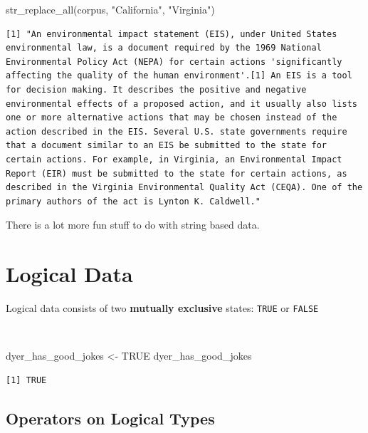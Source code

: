 \documentclass[
  letterpaper,
]{book}
\newenvironment{Shaded}{\begin{snugshade}}{\end{snugshade}}
\newcommand{\ConstantTok}[1]{\textcolor[rgb]{0.56,0.35,0.01}{#1}}
\newcommand{\FunctionTok}[1]{\textcolor[rgb]{0.28,0.35,0.67}{#1}}
\newcommand{\NormalTok}[1]{\textcolor[rgb]{0.00,0.23,0.31}{#1}}
\newcommand{\OtherTok}[1]{\textcolor[rgb]{0.00,0.23,0.31}{#1}}
\newcommand{\StringTok}[1]{\textcolor[rgb]{0.13,0.47,0.30}{#1}}
\begin{document}
\begin{Shaded}
\begin{Highlighting}[]
\FunctionTok{str\_replace\_all}\NormalTok{(corpus, }\StringTok{"California"}\NormalTok{, }\StringTok{"Virginia"}\NormalTok{)}
\end{Highlighting}
\end{Shaded}

\begin{verbatim}
[1] "An environmental impact statement (EIS), under United States environmental law, is a document required by the 1969 National Environmental Policy Act (NEPA) for certain actions 'significantly affecting the quality of the human environment'.[1] An EIS is a tool for decision making. It describes the positive and negative environmental effects of a proposed action, and it usually also lists one or more alternative actions that may be chosen instead of the action described in the EIS. Several U.S. state governments require that a document similar to an EIS be submitted to the state for certain actions. For example, in Virginia, an Environmental Impact Report (EIR) must be submitted to the state for certain actions, as described in the Virginia Environmental Quality Act (CEQA). One of the primary authors of the act is Lynton K. Caldwell."
\end{verbatim}

There is a lot more fun stuff to do with string based data.

\section{Logical Data}\label{logical-data}

Logical data consists of two \textbf{mutually exclusive} states:
\texttt{TRUE} or \texttt{FALSE}

~

\begin{Shaded}
\begin{Highlighting}[]
\NormalTok{dyer\_has\_good\_jokes }\OtherTok{\textless{}{-}} \ConstantTok{TRUE}
\NormalTok{dyer\_has\_good\_jokes}
\end{Highlighting}
\end{Shaded}

\begin{verbatim}
[1] TRUE
\end{verbatim}

\subsection{Operators on Logical
Types}\label{operators-on-logical-types}
\end{document}
